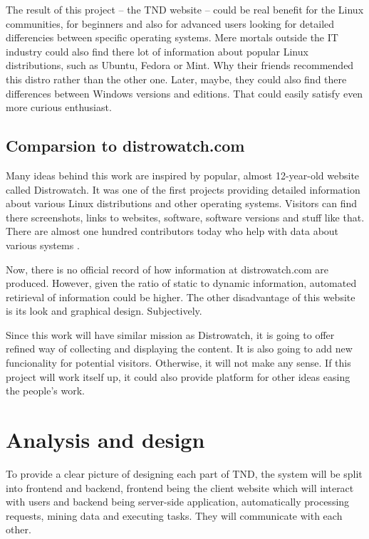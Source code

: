 \documentclass[thesis=B,english]{FITthesis}[2013/04/26]
\begin{document}
The result of this project -- the TND website -- could be real benefit for the Linux communities, for beginners and also for advanced users looking for detailed differencies between specific operating systems. Mere mortals outside the IT industry could also find there lot of information about popular Linux distributions, such as Ubuntu, Fedora or Mint. Why their friends recommended this distro rather than the other one. Later, maybe, they could also find there differences between Windows versions and editions. That could easily satisfy even more curious enthusiast.

\section{Comparsion to distrowatch.com}

Many ideas behind this work are inspired by popular, almost 12-year-old website called Distrowatch. It was one of the first projects providing detailed information about various Linux distributions and other operating systems. Visitors can find there screenshots, links to websites, software, software versions and stuff like that. There are almost one hundred contributors today who help with data about various systems \cite{dw_about}.

Now, there is no official record of how information at distrowatch.com are produced. However, given the ratio of static to dynamic information, automated retirieval of information could be higher. The other disadvantage of this website is its look and graphical design. Subjectively.

Since this work will have similar mission as Distrowatch, it is going to offer refined way of collecting and displaying the content. It is also going to add new funcionality for potential visitors. Otherwise, it will not make any sense. If this project will work itself up, it could also provide platform for other ideas easing the people's work.


\chapter{Analysis and design}
\label{chapter:analysis_and_design}

To provide a clear picture of designing each part of TND, the system will be split into frontend and backend, frontend being the client website which will interact with users and backend being server-side application, automatically processing requests, mining data and executing tasks. They will communicate with each other.
\end{document}
